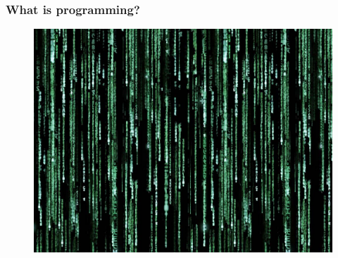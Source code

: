 \documentclass[handout]{beamer}
\begin{document}
\begin{frame}
\frametitle{What is programming?}
\centering \huge 

\begin{figure}
\includegraphics[scale=0.28]{hack.jpg}
\end{figure}
% 
% 
% 
% 

% 

\end{frame}
\end{document}
